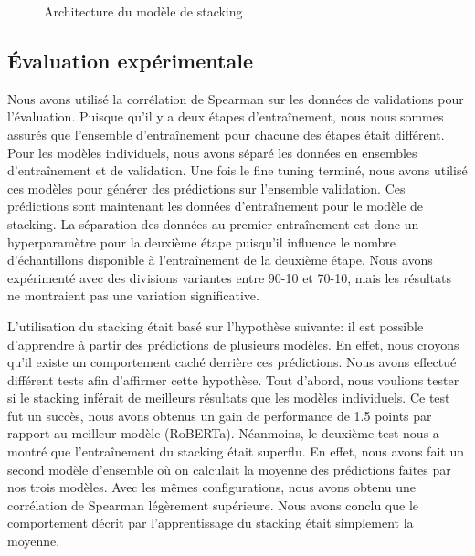 \documentclass[11pt,a4paper, french]{article}
\begin{document}
\begin{figure}
\begin{center}
\caption{Architecture du modèle de stacking} \label{fig:stacking:archi}
\end{center}
\end{figure}

\subsection{Évaluation expérimentale }

Nous avons utilisé la corrélation de Spearman sur les données de validations pour l’évaluation. Puisque qu’il y a deux étapes d'entraînement, nous nous sommes assurés que l’ensemble d'entraînement pour chacune des étapes était différent. Pour les modèles individuels, nous avons séparé les données en ensembles d'entraînement et de validation. Une fois le fine tuning terminé, nous avons utilisé ces modèles pour générer des prédictions sur l’ensemble validation. Ces prédictions sont maintenant les données d'entraînement pour le modèle de stacking. La séparation des données au premier entraînement est donc un hyperparamètre pour la deuxième étape puisqu’il influence le nombre d’échantillons disponible à l'entraînement de la deuxième étape. Nous avons expérimenté avec des divisions variantes entre 90-10 et 70-10, mais les résultats ne montraient pas une variation significative. 

	L’utilisation du stacking était basé sur l’hypothèse suivante: il est possible d’apprendre à partir des prédictions de plusieurs modèles. En effet, nous croyons qu’il existe un comportement caché derrière ces prédictions. Nous avons effectué différent tests afin d’affirmer cette hypothèse. Tout d'abord, nous voulions tester si le stacking inférait de meilleurs résultats que les modèles individuels. Ce test fut un succès, nous avons obtenus un gain de performance de 1.5 points par rapport au meilleur modèle (RoBERTa). Néanmoins, le deuxième test nous a montré que l'entraînement du stacking était superflu. En effet, nous avons fait un second modèle d’ensemble où on calculait la moyenne des prédictions faites par nos trois modèles. Avec les mêmes configurations, nous avons obtenu une corrélation de Spearman légèrement supérieure. Nous avons conclu que le comportement décrit par l’apprentissage du stacking était simplement la moyenne.
\end{document}
